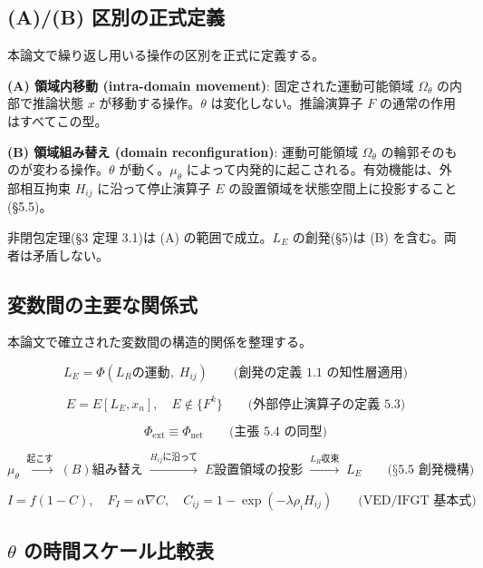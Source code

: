 \bigskip


\subsection{(A)/(B) 区別の正式定義}


本論文で繰り返し用いる操作の区別を正式に定義する。

\textbf{(A) 領域内移動 (intra-domain movement)}:
固定された運動可能領域 $\Omega_\theta$ の内部で推論状態 $x$ が移動する操作。$\theta$ は変化しない。推論演算子 $F$ の通常の作用はすべてこの型。

\textbf{(B) 領域組み替え (domain reconfiguration)}:
運動可能領域 $\Omega_\theta$ の輪郭そのものが変わる操作。$\theta$ が動く。$\mu_\theta$ によって内発的に起こされる。有効機能は、外部相互拘束 $H_{ij}$ に沿って停止演算子 $E$ の設置領域を状態空間上に投影すること(\S{}5.5)。

非閉包定理(\S{}3 定理 3.1)は (A) の範囲で成立。$L_E$ の創発(\S{}5)は (B) を含む。両者は矛盾しない。

\bigskip


\subsection{変数間の主要な関係式}


本論文で確立された変数間の構造的関係を整理する。

\[
L_E = \Phi(L_R \text{の運動}, \; H_{ij}) \qquad \text{(創発の定義 1.1 の知性層適用)}
\]

\[
E = E[L_E, x_n], \quad E \notin \{F^k\} \qquad \text{(外部停止演算子の定義 5.3)}
\]

\[
\Phi_{\text{ext}} \equiv \Phi_{\text{net}} \qquad \text{(主張 5.4 の同型)}
\]

\[
\mu_\theta \;\xrightarrow{\text{起こす}}\; (B)\text{組み替え} \;\xrightarrow{H_{ij}\text{に沿って}}\; E\text{設置領域の投影} \;\xrightarrow{L_R\text{収束}}\; L_E \qquad \text{(§5.5 創発機構)}
\]

\[
I = f(1-C), \quad F_I = \alpha \nabla C, \quad C_{ij} = 1 - \exp(-\lambda \rho_i H_{ij}) \qquad \text{(VED/IFGT 基本式)}
\]

\bigskip


\subsection{$\theta$ の時間スケール比較表}


